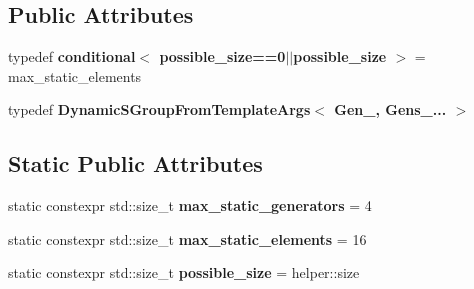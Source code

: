 \subsection*{Public Attributes}
\begin{DoxyCompactItemize}
\item 
\mbox{\label{struct_eigen_1_1internal_1_1tensor__symmetry__pre__analysis_3_01_num_indices_00_01_gen___00_01_gens___8_8_8_01_4_ae25843fa3cfce824755ddc58656842b0}} 
typedef {\bfseries conditional$<$ possible\+\_\+size==0$\vert$$\vert$possible\+\_\+size $>$} = max\+\_\+static\+\_\+elements
\item 
\mbox{\label{struct_eigen_1_1internal_1_1tensor__symmetry__pre__analysis_3_01_num_indices_00_01_gen___00_01_gens___8_8_8_01_4_a3e5d88b9603f5ad42bbcfdcd6df00f60}} 
typedef {\bfseries Dynamic\+S\+Group\+From\+Template\+Args$<$ Gen\+\_\+, Gens\+\_\+... $>$}
\end{DoxyCompactItemize}
\subsection*{Static Public Attributes}
\begin{DoxyCompactItemize}
\item 
\mbox{\label{struct_eigen_1_1internal_1_1tensor__symmetry__pre__analysis_3_01_num_indices_00_01_gen___00_01_gens___8_8_8_01_4_a7b3756ffda8a5adef5323a5253790746}} 
static constexpr std\+::size\+\_\+t {\bfseries max\+\_\+static\+\_\+generators} = 4
\item 
\mbox{\label{struct_eigen_1_1internal_1_1tensor__symmetry__pre__analysis_3_01_num_indices_00_01_gen___00_01_gens___8_8_8_01_4_a0b03af6e859db64c56a83dae6fc919a2}} 
static constexpr std\+::size\+\_\+t {\bfseries max\+\_\+static\+\_\+elements} = 16
\item 
\mbox{\label{struct_eigen_1_1internal_1_1tensor__symmetry__pre__analysis_3_01_num_indices_00_01_gen___00_01_gens___8_8_8_01_4_a7cba43ead6ec449d7ed03549d445fd57}} 
static constexpr std\+::size\+\_\+t {\bfseries possible\+\_\+size} = helper\+::size
\end{DoxyCompactItemize}


